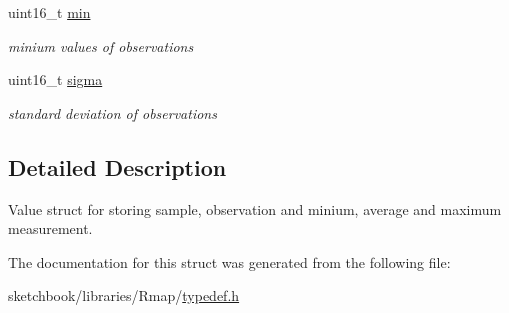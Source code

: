 \begin{DoxyCompactItemize}
\mbox{\label{structvalue__t_adbf21dc988c8a5bf520aae321703b6fd}} 
uint16\+\_\+t \hyperlink{structvalue__t_adbf21dc988c8a5bf520aae321703b6fd}{min}
\begin{DoxyCompactList}\small\item\em minium values of observations \end{DoxyCompactList}\item 
\mbox{\label{structvalue__t_a4d2f04777aa74135149e99af7a0d4166}} 
uint16\+\_\+t \hyperlink{structvalue__t_a4d2f04777aa74135149e99af7a0d4166}{sigma}
\begin{DoxyCompactList}\small\item\em standard deviation of observations \end{DoxyCompactList}\end{DoxyCompactItemize}


\subsection{Detailed Description}
Value struct for storing sample, observation and minium, average and maximum measurement. 

The documentation for this struct was generated from the following file\+:\begin{DoxyCompactItemize}
\item 
sketchbook/libraries/\+Rmap/\hyperlink{typedef_8h}{typedef.\+h}\end{DoxyCompactItemize}
